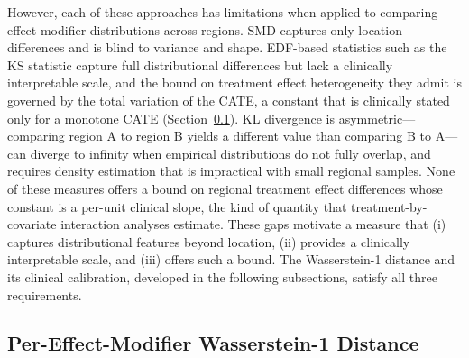 \documentclass[AMA,Times1COL]{WileyNJDv5}
\begin{document}
However, each of these approaches has limitations when applied to comparing effect modifier distributions across regions. SMD captures only location differences and is blind to variance and shape. EDF-based statistics such as the KS statistic capture full distributional differences but lack a clinically interpretable scale, and the bound on treatment effect heterogeneity they admit is governed by the total variation of the CATE, a constant that is clinically stated only for a monotone CATE (Section~\ref{sec:nabcd_metric}). KL divergence is asymmetric---comparing region A to region B yields a different value than comparing B to A---can diverge to infinity when empirical distributions do not fully overlap, and requires density estimation that is impractical with small regional samples. None of these measures offers a bound on regional treatment effect differences whose constant is a per-unit clinical slope, the kind of quantity that treatment-by-covariate interaction analyses estimate. These gaps motivate a measure that (i) captures distributional features beyond location, (ii) provides a clinically interpretable scale, and (iii) offers such a bound. The Wasserstein-1 distance and its clinical calibration, developed in the following subsections, satisfy all three requirements.

\subsection{Per-Effect-Modifier Wasserstein-1 Distance}\label{sec:nabcd_metric}
\end{document}
